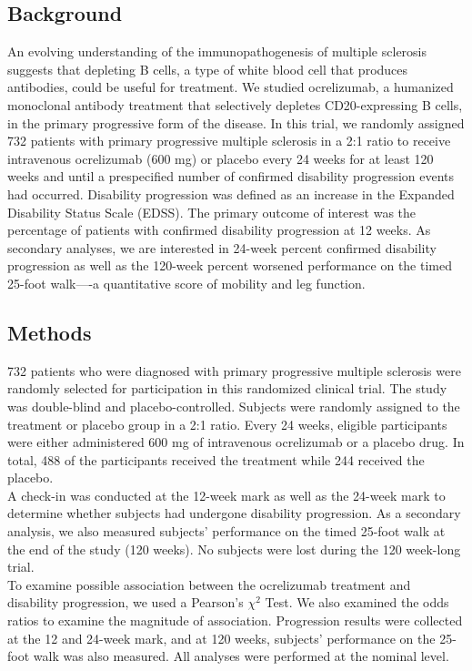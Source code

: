 \documentclass{article}
\begin{document}
	\newpage
	\subsection*{Background}
		
		An evolving understanding of the immunopathogenesis of multiple sclerosis suggests that depleting B cells, a type of white blood cell that produces antibodies, could be useful for treatment. We studied ocrelizumab, a humanized monoclonal antibody treatment that selectively depletes CD20-expressing B cells, in the primary progressive form of the disease. In this trial, we randomly assigned 732 patients with primary progressive multiple sclerosis in a 2:1 ratio to receive intravenous ocrelizumab (600 mg) or placebo every 24 weeks for at least 120 weeks and until a prespecified number of confirmed disability progression events had occurred. Disability progression was defined as an increase in the Expanded Disability Status Scale (EDSS). The primary outcome of interest was the percentage of patients with confirmed disability progression at 12 weeks. As secondary analyses, we are interested in 24-week percent confirmed disability progression as well as the 120-week percent worsened performance on the timed 25-foot walk----a quantitative score of mobility and leg function.

	\subsection*{Methods}
	732 patients who were diagnosed with primary progressive multiple sclerosis were randomly selected for participation in this randomized clinical trial. The study was double-blind and placebo-controlled. Subjects were randomly assigned to the treatment or placebo group in a 2:1 ratio. Every 24 weeks, eligible participants were either administered 600 mg of intravenous ocrelizumab or a placebo drug. In total, 488 of the participants received the treatment while 244 received the placebo. \\


	A check-in was conducted at the 12-week mark as well as the 24-week mark to determine whether subjects had undergone disability progression. As a secondary analysis, we also measured subjects’ performance on the timed 25-foot walk at the end of the study (120 weeks). No subjects were lost during the 120 week-long trial. \\


	To examine possible association between the ocrelizumab treatment and disability progression, we used a Pearson’s $\chi^2$ Test. We also examined the odds ratios to examine the magnitude of association. Progression results were collected at the 12 and 24-week mark, and at 120 weeks, subjects’ performance on the 25-foot walk was also measured. All analyses were performed at the nominal level.
\end{document}
